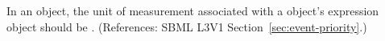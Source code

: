 In an \Event object, the unit of measurement associated with a \Priority
object's  expression object should be .  (References:
SBML L3V1 Section~\ref{sec:event-priority}.)
